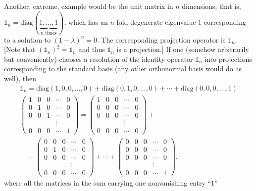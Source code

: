 {Another, extreme, example would be the unit matrix in $n$ dimensions; that is,
$\mathbb{1}_n=\textrm{diag}(\underbrace{1,\ldots ,1}_{n \textrm{ times}})$,
which has an $n$-fold degenerate eigenvalue $1$ corresponding to a solution to
$(1-\lambda )^n=0$.
The corresponding projection operator is $\mathbb{1}_n$.  [Note that $(\mathbb{1}_n)^2 =\mathbb{1}_n$
and thus $\mathbb{1}_n$ is a projection.]
If one (somehow arbitrarily but conveniently) chooses a resolution of the identity operator $\mathbb{1}_n$
into projections corresponding to the standard basis (any other orthonormal basis would do as well),
then
\begin{equation}
\begin{split}
\mathbb{1}_n = \textrm{diag}( 1,0,0,\ldots ,0 )
+   \textrm{diag}( 0,1,0,\ldots ,0 )
+ \cdots
+   \textrm{diag}( 0,0,0,\ldots ,1 )\\
\begin{pmatrix}
 1&0&0&\cdots &0\\
 0&1&0&\cdots &0\\
 0&0&1&\cdots &0\\
&&&\vdots&\\
 0&0&0&\cdots &1
\end{pmatrix}  =
\begin{pmatrix}
 1&0&0&\cdots &0\\
 0&0&0&\cdots &0\\
 0&0&0&\cdots &0\\
&&&\vdots&\\
 0&0&0&\cdots &0
\end{pmatrix}  +
\\
\quad
+%
\begin{pmatrix}
 0&0&0&\cdots &0\\
 0&1&0&\cdots &0\\
 0&0&0&\cdots &0\\
&&&\vdots&\\
 0&0&0&\cdots &0
\end{pmatrix} +\cdots
+%
\begin{pmatrix}
 0&0&0&\cdots &0\\
 0&0&0&\cdots &0\\
 0&0&0&\cdots &0\\
&&&\vdots&\\
 0&0&0&\cdots &1
\end{pmatrix}
,
\end{split}
\end{equation}
where all the matrices in the sum carrying one nonvanishing entry ``$1$''
}
